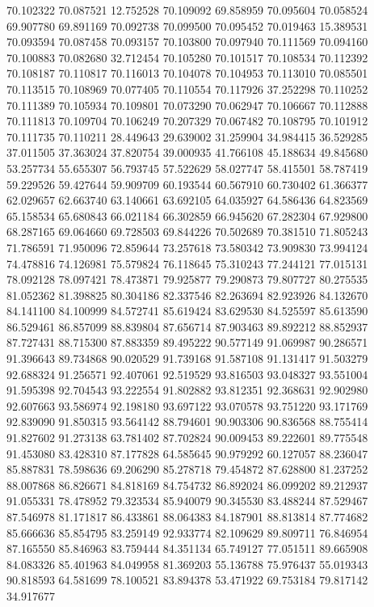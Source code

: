 70.102322
70.087521
12.752528
70.109092
69.858959
70.095604
70.058524
69.907780
69.891169
70.092738
70.099500
70.095452
70.019463
15.389531
70.093594
70.087458
70.093157
70.103800
70.097940
70.111569
70.094160
70.100883
70.082680
32.712454
70.105280
70.101517
70.108534
70.112392
70.108187
70.110817
70.116013
70.104078
70.104953
70.113010
70.085501
70.113515
70.108969
70.077405
70.110554
70.117926
37.252298
70.110252
70.111389
70.105934
70.109801
70.073290
70.062947
70.106667
70.112888
70.111813
70.109704
70.106249
70.207329
70.067482
70.108795
70.101912
70.111735
70.110211
28.449643
29.639002
31.259904
34.984415
36.529285
37.011505
37.363024
37.820754
39.000935
41.766108
45.188634
49.845680
53.257734
55.655307
56.793745
57.522629
58.027747
58.415501
58.787419
59.229526
59.427644
59.909709
60.193544
60.567910
60.730402
61.366377
62.029657
62.663740
63.140661
63.692105
64.035927
64.586436
64.823569
65.158534
65.680843
66.021184
66.302859
66.945620
67.282304
67.929800
68.287165
69.064660
69.728503
69.844226
70.502689
70.381510
71.805243
71.786591
71.950096
72.859644
73.257618
73.580342
73.909830
73.994124
74.478816
74.126981
75.579824
76.118645
75.310243
77.244121
77.015131
78.092128
78.097421
78.473871
79.925877
79.290873
79.807727
80.275535
81.052362
81.398825
80.304186
82.337546
82.263694
82.923926
84.132670
84.141100
84.100999
84.572741
85.619424
83.629530
84.525597
85.613590
86.529461
86.857099
88.839804
87.656714
87.903463
89.892212
88.852937
87.727431
88.715300
87.883359
89.495222
90.577149
91.069987
90.286571
91.396643
89.734868
90.020529
91.739168
91.587108
91.131417
91.503279
92.688324
91.256571
92.407061
92.519529
93.816503
93.048327
93.551004
91.595398
92.704543
93.222554
91.802882
93.812351
92.368631
92.902980
92.607663
93.586974
92.198180
93.697122
93.070578
93.751220
93.171769
92.839090
91.850315
93.564142
88.794601
90.903306
90.836568
88.755414
91.827602
91.273138
63.781402
87.702824
90.009453
89.222601
89.775548
91.453080
83.428310
87.177828
64.585645
90.979292
60.127057
88.236047
85.887831
78.598636
69.206290
85.278718
79.454872
87.628800
81.237252
88.007868
86.826671
84.818169
84.754732
86.892024
86.099202
89.212937
91.055331
78.478952
79.323534
85.940079
90.345530
83.488244
87.529467
87.546978
81.171817
86.433861
88.064383
84.187901
88.813814
87.774682
85.666636
85.854795
83.259149
92.933774
82.109629
89.809711
76.846954
87.165550
85.846963
83.759444
84.351134
65.749127
77.051511
89.665908
84.083326
85.401963
84.049958
81.369203
55.136788
75.976437
55.019343
90.818593
64.581699
78.100521
83.894378
53.471922
69.753184
79.817142
34.917677
